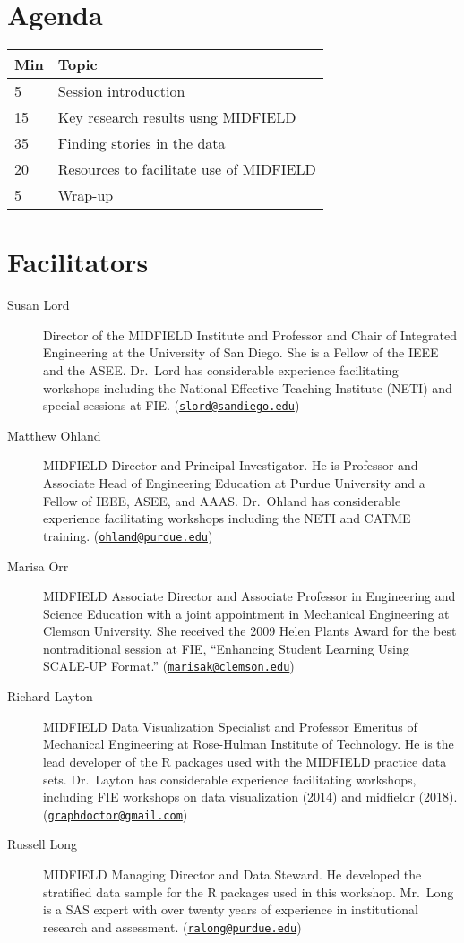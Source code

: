 \documentclass[
]{book}
\begin{document}
\hypertarget{agenda}{%
\section{Agenda}\label{agenda}}

\begin{tabular}{ll}
\toprule
Min & Topic\\
\midrule
5 & Session introduction\\
15 & Key research results usng MIDFIELD\\
35 & Finding stories in the data\\
20 & Resources to facilitate use of MIDFIELD\\
5 & Wrap-up\\
\bottomrule
\end{tabular}

\hypertarget{facilitators}{%
\section{Facilitators}\label{facilitators}}

\begin{description}
\item[Susan Lord]
Director of the MIDFIELD Institute and Professor and Chair of Integrated Engineering at the University of San Diego. She is a Fellow of the IEEE and the ASEE. Dr.~Lord has considerable experience facilitating workshops including the National Effective Teaching Institute (NETI) and special sessions at FIE. (\href{mailto:slord@sandiego.edu}{\nolinkurl{slord@sandiego.edu}})
\item[Matthew Ohland]
MIDFIELD Director and Principal Investigator. He is Professor and Associate Head of Engineering Education at Purdue University and a Fellow of IEEE, ASEE, and AAAS. Dr.~Ohland has considerable experience facilitating workshops including the NETI and CATME training. (\href{mailto:ohland@purdue.edu}{\nolinkurl{ohland@purdue.edu}})
\item[Marisa Orr]
MIDFIELD Associate Director and Associate Professor in Engineering and Science Education with a joint appointment in Mechanical Engineering at Clemson University. She received the 2009 Helen Plants Award for the best nontraditional session at FIE, ``Enhancing Student Learning Using SCALE-UP Format.'' (\href{mailto:marisak@clemson.edu}{\nolinkurl{marisak@clemson.edu}})
\item[Richard Layton]
MIDFIELD Data Visualization Specialist and Professor Emeritus of Mechanical Engineering at Rose-Hulman Institute of Technology. He is the lead developer of the R packages used with the MIDFIELD practice data sets. Dr.~Layton has considerable experience facilitating workshops, including FIE workshops on data visualization (2014) and midfieldr (2018). (\href{mailto:graphdoctor@gmail.com}{\nolinkurl{graphdoctor@gmail.com}})
\item[Russell Long]
MIDFIELD Managing Director and Data Steward. He developed the stratified data sample for the R packages used in this workshop. Mr.~Long is a SAS expert with over twenty years of experience in institutional research and assessment. (\href{mailto:ralong@purdue.edu}{\nolinkurl{ralong@purdue.edu}})
\end{description}
\end{document}
